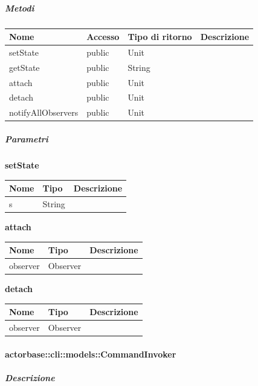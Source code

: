 \documentclass{scalatekids-article}
\begin{document}
\subparagraph{Metodi}

\begin{tabular}{| l | l | l | l |}
  \hline
  Nome & Accesso & Tipo di ritorno & Descrizione\\
  \hline
  setState & public & Unit & \\
  \hline
  getState & public & String & \\
  \hline
  attach & public & Unit & \\
  \hline
  detach & public & Unit & \\
  \hline
  notifyAllObservers & public & Unit & \\
  \hline
\end{tabular}

\subparagraph{Parametri}

\begin{center}
  \textbf{setState}
\end{center}
\begin{tabular}{| p{3cm} | p{3.5cm} | p{8.5cm} |}
  \hline
  Nome & Tipo & Descrizione\\
  \hline
  s & String & \\
  \hline
\end{tabular}

\begin{center}
  \textbf{attach}
\end{center}
\begin{tabular}{| p{3cm} | p{3.5cm} | p{8.5cm} |}
  \hline
  Nome & Tipo & Descrizione\\
  \hline
  observer & Observer & \\
  \hline
\end{tabular}

\begin{center}
  \textbf{detach}
\end{center}
\begin{tabular}{| p{3cm} | p{3.5cm} | p{8.5cm} |}
  \hline
  Nome & Tipo & Descrizione\\
  \hline
  observer & Observer & \\
  \hline
\end{tabular}

\paragraph{actorbase::cli::models::CommandInvoker}
\label{sec:actorbase::cli::models::CommandInvoker}

\subparagraph{Descrizione}
\end{document}
